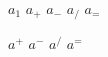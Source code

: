\documentclass{minimal}
\begin{document}
$a_1$
$a_+$
$a_-$
$a_/$
$a_=$

$a^+$
$a^-$
$a^/$
$a^=$
\end{document}
